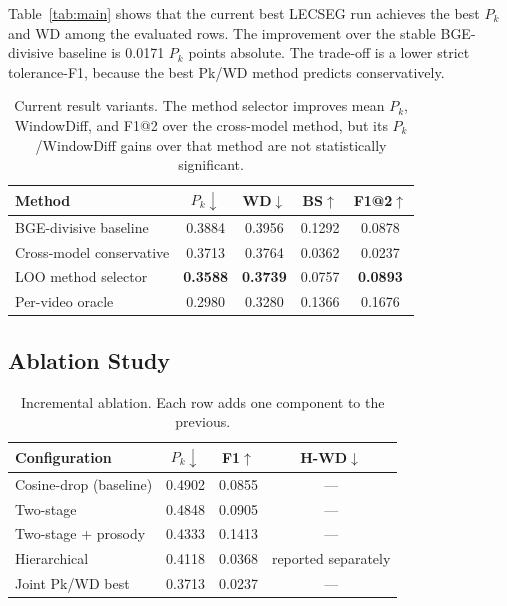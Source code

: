 \documentclass[conference]{IEEEtran}
\begin{document}
Table~\ref{tab:main} shows that the current best LECSEG run achieves the best
$P_k$ and WD among the evaluated rows. The improvement over the stable
BGE-divisive baseline is 0.0171 $P_k$ points absolute. The trade-off is a lower
strict tolerance-F1, because the best Pk/WD method predicts conservatively.

\begin{table}[t]
  \centering
  \caption{Current result variants. The method selector improves mean $P_k$,
  WindowDiff, and F1@2 over the cross-model method, but its $P_k$/WindowDiff
  gains over that method are not statistically significant.}
  \label{tab:selector}
  \setlength{\tabcolsep}{4pt}
  \begin{tabular}{lcccc}
    \toprule
    Method & $P_k\downarrow$ & WD$\downarrow$ & BS$\uparrow$ & F1@2$\uparrow$ \\
    \midrule
    BGE-divisive baseline & 0.3884 & 0.3956 & 0.1292 & 0.0878 \\
    Cross-model conservative & 0.3713 & 0.3764 & 0.0362 & 0.0237 \\
    LOO method selector & \textbf{0.3588} & \textbf{0.3739} & 0.0757 & \textbf{0.0893} \\
    Per-video oracle & 0.2980 & 0.3280 & 0.1366 & 0.1676 \\
    \bottomrule
  \end{tabular}
\end{table}

\subsection{Ablation Study}

\begin{table}[t]
  \centering
  \caption{Incremental ablation. Each row adds one component to the previous.}
  \label{tab:ablation}
  \begin{tabular}{lccc}
    \toprule
    Configuration & $P_k\downarrow$ & F1$\uparrow$ & H-WD$\downarrow$ \\
    \midrule
    Cosine-drop (baseline)  & 0.4902 & 0.0855 & --- \\
    Two-stage              & 0.4848 & 0.0905 & --- \\
    Two-stage + prosody    & 0.4333 & 0.1413 & --- \\
    Hierarchical           & 0.4118 & 0.0368 & reported separately \\
    Joint Pk/WD best       & 0.3713 & 0.0237 & --- \\
    \bottomrule
  \end{tabular}
\end{table}
\end{document}
